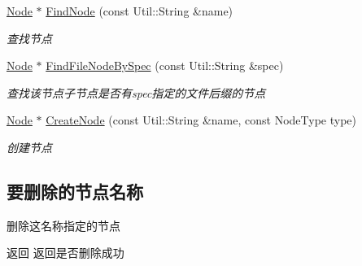 \begin{DoxyCompactItemize}
\hyperlink{class_file_sys_1_1_node}{Node} $\ast$ \hyperlink{class_file_sys_1_1_node_ab14d6ddc49b811ca57403992312a939a}{Find\-Node} (const Util\-::\-String \&name)
\begin{DoxyCompactList}\small\item\em 查找节点 \end{DoxyCompactList}\item 
\hyperlink{class_file_sys_1_1_node}{Node} $\ast$ \hyperlink{class_file_sys_1_1_node_ac55bdfd5962f88ac3c1848ad59dae30a}{Find\-File\-Node\-By\-Spec} (const Util\-::\-String \&spec)
\begin{DoxyCompactList}\small\item\em 查找该节点子节点是否有spec指定的文件后缀的节点 \end{DoxyCompactList}\item 
\hyperlink{class_file_sys_1_1_node}{Node} $\ast$ \hyperlink{class_file_sys_1_1_node_a442bb04445155587d095d628dbec6bf6}{Create\-Node} (const Util\-::\-String \&name, const Node\-Type type)
\begin{DoxyCompactList}\small\item\em 创建节点 \end{DoxyCompactList}\end{DoxyCompactItemize}
\subsection*{要删除的节点名称}
\label{_amgrpd279e7a5021fed3be0fd53799466000c}%
删除这名称指定的节点

\begin{DoxyReturn}{返回}
返回是否删除成功 
\end{DoxyReturn}

